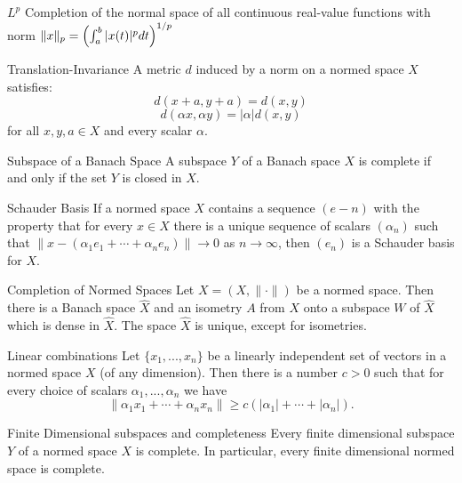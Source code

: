 \documentclass[avery5388,grid,frame]{flashcards}
\begin{document}
\begin{flashcard}[Example]{$L^p$}
Completion of the normal space of all continuous real-value functions with norm $\|x\|_p=\Bigl(\int_a^b|x(t)|^pdt\Bigr)^{1/p}$
\end{flashcard}

\begin{flashcard}[Theorem]{Translation-Invariance}
A metric $d$ induced by a norm on a normed space $X$ satisfies:
\[d(x+a,y+a)=d(x,y)\]
\[d(\alpha x,\alpha y)=|\alpha|d(x,y)\]
for all $x,y,a\in X$ and every scalar $\alpha$.
\end{flashcard}

\begin{flashcard}[Theorem]{Subspace of  a Banach Space}
A subspace $Y$ of a Banach space $X$ is complete if and only if the set $Y$ is closed in $X$.
\end{flashcard}

\begin{flashcard}[Definition]{Schauder Basis}
If a normed space $X$ contains a sequence $(e-n)$ with the property that for every $x\in X$ there is a unique sequence of scalars $(\alpha_n)$ such that $\|x-(\alpha_1e_1+\dotsb+\alpha_ne_n)\|\rightarrow 0$ as $n\rightarrow\infty$, then $(e_n)$ is a Schauder basis for $X$.
\end{flashcard}

\begin{flashcard}[Theorem]{Completion of Normed Spaces}
Let $X=(X,\|\cdot\|)$ be a normed space. Then there is a Banach space $\hat{X}$ and an isometry $A$ from $X$ onto a subspace $W$ of $\hat{X}$ which is dense in $\hat{X}$. The space $\hat{X}$ is unique, except for isometries.
\end{flashcard}

\begin{flashcard}[Theorem]{Linear combinations}
Let $\{x_1,...,x_n\}$ be a linearly independent set of vectors in a normed space $X$ (of any dimension). Then there is a number $c>0$ such that for every choice of scalars $\alpha_1,...,\alpha_n$ we have
\[\|\alpha_1x_1+\dotsb+\alpha_nx_n\|\geq c(|\alpha_1|+\dotsb+|\alpha_n|).\]
\end{flashcard}

\begin{flashcard}[Theorem]{Finite Dimensional subspaces and completeness}
Every finite dimensional subspace $Y$ of a normed space $X$ is complete. In particular, every finite dimensional normed space is complete.
\end{flashcard}
\end{document}
